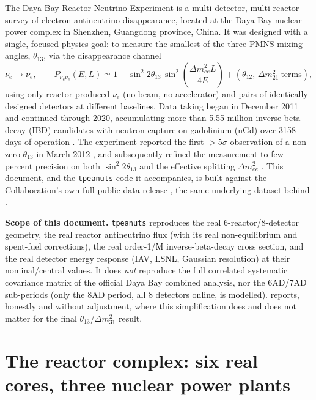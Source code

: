 The Daya Bay Reactor Neutrino Experiment is a multi-detector, multi-reactor
survey of electron-antineutrino disappearance, located at the Daya Bay
nuclear power complex in Shenzhen, Guangdong province, China. It was
designed with a single, focused physics goal: to measure the smallest of
the three PMNS mixing angles, $\theta_{13}$, via the disappearance channel
\begin{equation}
  \bar\nu_e \to \bar\nu_e, \qquad
  P_{\bar\nu_e\bar\nu_e}(E,L) \simeq 1 - \sin^2 2\theta_{13}\,
    \sin^2\!\left(\frac{\Delta m^2_{ee}L}{4E}\right)
    + \left(\theta_{12},\,\Delta m^2_{21}\ \text{terms}\right),
  \label{eq:intro-survival-schematic}
\end{equation}
using only reactor-produced $\bar\nu_e$ (no beam, no accelerator) and pairs
of identically designed detectors at different baselines. Data taking began
in December 2011 and continued through 2020, accumulating more than 5.55
million inverse-beta-decay (IBD) candidates with neutron capture on
gadolinium (nGd) over 3158 days of operation
\parencite{An2017DayaBayFluxSpectrum}. The experiment reported the first
$>5\sigma$ observation of a non-zero $\theta_{13}$ in March 2012
\parencite{An2012DayaBayDiscovery}, and subsequently refined the
measurement to few-percent precision on both $\sin^2 2\theta_{13}$ and the
effective splitting $\Delta m^2_{ee}$ \parencite{An2023DayaBayPrecision}.
This document, and the \texttt{tpeanuts} code it accompanies, is built
against the Collaboration's own full public data release
\parencite{DayaBayZenodo2025}, the same underlying dataset behind
\cite{An2023DayaBayPrecision}.

\begin{notebox}
\textbf{Scope of this document.} \texttt{tpeanuts} reproduces the real
6-reactor/8-detector geometry, the real reactor antineutrino flux (with its
real non-equilibrium and spent-fuel corrections), the real order-1/M
inverse-beta-decay cross section, and the real detector energy response
(IAV, LSNL, Gaussian resolution) at their nominal/central values. It does
\emph{not} reproduce the full correlated systematic covariance matrix of
the official Daya Bay combined analysis, nor the 6AD/7AD sub-periods (only
the 8AD period, all 8 detectors online, is modelled). 
reports, honestly and without adjustment, where this simplification does
and does not matter for the final $\theta_{13}$/$\Delta m^2_{31}$ result.
\end{notebox}

\section{The reactor complex: six real cores, three nuclear power plants}
\label{sec:reactor-geometry}

